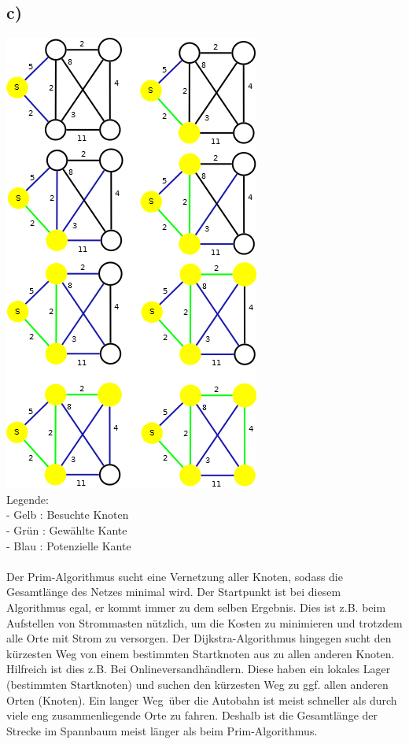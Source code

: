 \documentclass[a4paper,11pt,twoside]{article}
\begin{document}
\subsection*{c)} 
\includegraphics*[scale=1]{Bilder/2b_Prim.png}\\
Legende:\\
- Gelb : Besuchte Knoten\\
- Grün : Gewählte Kante\\
- Blau : Potenzielle Kante\\
\\
Der Prim-Algorithmus sucht eine Vernetzung aller Knoten, sodass die Gesamtlänge des Netzes minimal wird. Der Startpunkt ist bei diesem Algorithmus egal, er kommt immer zu dem selben Ergebnis. Dies ist z.B. beim Aufstellen von Strommasten nützlich, um die Kosten zu minimieren und trotzdem alle Orte mit Strom zu versorgen.
Der Dijkstra-Algorithmus hingegen sucht den kürzesten Weg von einem bestimmten Startknoten aus zu allen anderen Knoten. Hilfreich ist dies z.B. Bei Onlineversandhändlern. Diese haben ein lokales Lager (bestimmten Startknoten) und suchen den kürzesten Weg zu ggf. allen anderen Orten (Knoten). Ein \glqq langer Weg\grqq ~über die Autobahn ist meist schneller als durch viele eng zusammenliegende Orte zu fahren. Deshalb ist die Gesamtlänge der Strecke im Spannbaum meist länger als beim Prim-Algorithmus.
\end{document}
